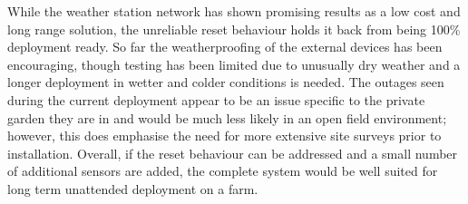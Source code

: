 While the weather station network has shown promising results as a low cost and
long range solution, the unreliable reset behaviour holds it back from being
100\% deployment ready. So far the weatherproofing of the external devices has
been encouraging, though testing has been limited due to unusually dry weather
and a longer deployment in wetter and colder conditions is needed. The outages
seen during the current deployment appear to be an issue specific to the private
garden they are in and would be much less likely in an open field environment;
however, this does emphasise the need for more extensive site surveys prior to
installation. Overall, if the reset behaviour can be addressed and a small
number of additional sensors are added, the complete system would be well suited
for long term unattended deployment on a farm.